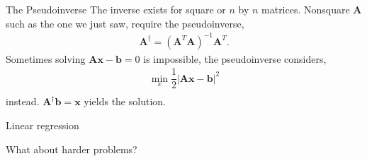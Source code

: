 \documentclass[notes]{beamer}
\begin{document}
    \begin{frame}{The Pseudoinverse \cite{strang2009introduction,deisenroth2020mathematics}}
      The inverse exists for square or $n$ by $n$ matrices.
      Nonsquare $\mathbf{A}$ such as the one we just saw, require the pseudoinverse,
        \begin{align}
          \mathbf{A}^{\dagger} = (\mathbf{A}^T\mathbf{A})^{-1}\mathbf{A}^T .
        \end{align}
      Sometimes solving $\mathbf{A}\mathbf{x} - \mathbf{b} = 0$ is impossible,
      the pseudoinverse considers,
        \begin{align}
          \min_x \dfrac{1}{2}|\mathbf{A}\mathbf{x} - \mathbf{b}|^2 \\
        \end{align}
      instead. $\mathbf{A}^{\dagger} \mathbf{b} = \mathbf{x}$ yields the solution.

    \end{frame}

    \begin{frame}{Linear regression}
      \begin{figure}
        
      \end{figure}
    \end{frame}

    \begin{frame}{What about harder problems?}
      \begin{figure}
        
      \end{figure}
    \end{frame}
\end{document}
